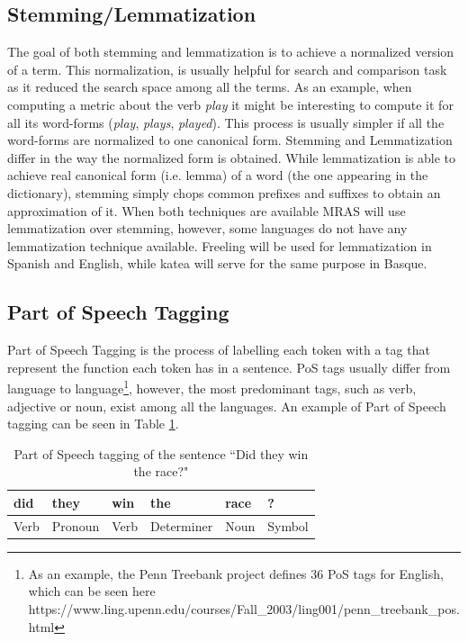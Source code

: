 \documentclass{bsu-ms}
\newcommand{\projectName}{MRAS\xspace}
\begin{document}
\subsection{Stemming/Lemmatization}
The goal of both stemming and lemmatization is to achieve a normalized version of a term. This normalization, is usually helpful for search and comparison task as it reduced the search space among all the terms. As an example, when computing a metric about the verb \emph{play} it might be interesting to compute it for all its word-forms (\emph{play}, \emph{plays}, \emph{played}). This process is usually simpler if all the word-forms are normalized to one canonical form. Stemming and Lemmatization differ in the way the normalized form is obtained. While lemmatization is able to achieve real canonical form (i.e. lemma) of a word (the one appearing in the dictionary), stemming simply chops common prefixes and suffixes to obtain an approximation of it. When both techniques are available \projectName will use lemmatization over stemming, however, some languages do not have any lemmatization technique available. Freeling will be used for lemmatization in Spanish and English, while katea will serve for the same purpose in Basque.




\subsection{Part of Speech Tagging}
Part of Speech Tagging is the process of labelling each token with a tag that represent the function each token has in a sentence. PoS tags usually differ from language to language\footnote{As an example, the Penn Treebank project defines 36 PoS tags for English, which can be seen here https://www.ling.upenn.edu/courses/Fall\_2003/ling001/penn\_treebank\_pos.html}, however, the most predominant tags, such as verb, adjective or noun, exist among all the languages. An example of Part of Speech tagging can be seen in Table \ref{tab:postagging}.



\begin{table}[h]
\centering
\begin{tabular}{|l|l|l|l|l|l|}
\hline
did & they & win & the & race & ? \\ \hline
Verb & Pronoun & Verb & Determiner & Noun & Symbol \\ \hline
\end{tabular}
\caption{Part of Speech tagging of the sentence ``Did they win the race?"}
\label{tab:postagging}
\end{table}
\end{document}
